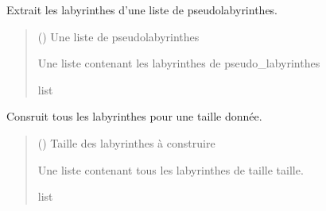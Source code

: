\documentclass[letterpaper,10pt,french]{sphinxmanual}
\begin{document}
\begin{fulllineitems}
\label{\detokenize{src:src.algorithmes_docs.filtre_liste_PseudoLabyrinthe}}
\pysigstartsignatures
{}
\pysigstopsignatures
\sphinxAtStartPar
Extrait les labyrinthes d’une liste de pseudo\sphinxhyphen{}labyrinthes.
\begin{quote}\begin{description}
\sphinxAtStartPar
{} () \textendash{} Une liste de pseudo\sphinxhyphen{}labyrinthes

\sphinxAtStartPar
Une liste contenant les labyrinthes de pseudo\_labyrinthes

\sphinxAtStartPar
list

\end{description}\end{quote}

\end{fulllineitems}


\begin{fulllineitems}
\label{\detokenize{src:src.algorithmes_docs.get_Labyrinthes}}
\pysigstartsignatures
{}
\pysigstopsignatures
\sphinxAtStartPar
Consruit tous les labyrinthes pour une taille donnée.
\begin{quote}\begin{description}
\sphinxAtStartPar
{} () \textendash{} Taille des labyrinthes à construire

\sphinxAtStartPar
Une liste contenant tous les labyrinthes de taille taille.

\sphinxAtStartPar
list

\end{description}\end{quote}

\end{fulllineitems}
\end{document}
